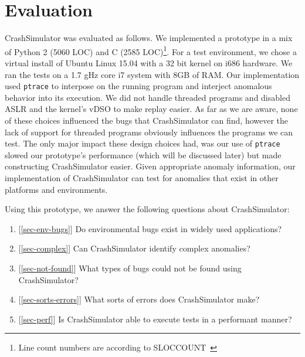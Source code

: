 \section{Evaluation}




CrashSimulator was evaluated as follows.
We implemented a prototype in a mix of Python 2 (5060 LOC) and C (2585 
LOC)\footnote{ Line count numbers are according to SLOCCOUNT~\cite{SLOCCOUNT}}.  
For a test
environment, we chose a virtual install of Ubuntu Linux 15.04 with a 32 bit 
kernel on i686 hardware.
We ran the tests on a 1.7 gHz core i7 system with 8GB of RAM. Our
implementation used {\tt ptrace} to interpose on the running program and
interject anomalous behavior into its execution.
We did not handle threaded programs and disabled ASLR and the kernel's vDSO 
to make replay easier.  As far as we are aware, none of these choices 
influenced the bugs that CrashSimulator can find, however the lack of support
for threaded programs obviously influences the programs we can test.  The 
only major impact these design choices had, was our use of {\tt ptrace} 
slowed our prototype's performance (which will be discussed later) but made
constructing CrashSimulator easier.  Given appropriate anomaly information, 
our implementation of CrashSimulator can
test for anomalies that exist in other platforms and environments.  

Using this prototype, we answer the following questions about CrashSimulator:

\begin{enumerate}
   \item{[\ref{sec-env-bugs}] Do environmental bugs exist in widely used applications?}
   \item{[\ref{sec-complex}] Can CrashSimulator identify complex anomalies?}
   \item{[\ref{sec-not-found}] What types of bugs could not be found using CrashSimulator?}
   \item{[\ref{sec-sorts-errors}] What sorts of errors does CrashSimulator make?}
   \item{[\ref{sec-perf}] Is CrashSimulator able to execute tests in a performant manner?}
\end{enumerate}



